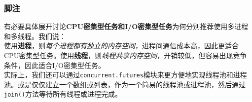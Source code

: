 \subsubsection{脚注}

有必要具体展开讨论\textbf{CPU密集型任务和I/O密集型任务}为何分别推荐使用多进程和多线程。我们说：\\

使用\textbf{进程}，则\textit{每个进程都有独立的内存空间}，进程间通信成本高，因此更适合CPU密集型任务。使用\textbf{线程}，则\textit{线程共享内存空间}，开销较低，但容易出现竞争条件，因此适合I/O密集型任务。\\

实际上，我们还可以通过\texttt{concurrent.futures}模块来更方便地实现线程池和进程池。或是仅仅建立一个数组或列表，作为一个简易的线程池或进程池，然后通过\texttt{join()}方法等待所有线程或进程完成。